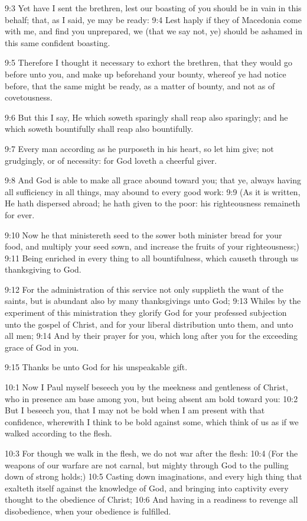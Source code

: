 9:3 Yet have I sent the brethren, lest our boasting of you should be
in vain in this behalf; that, as I said, ye may be ready: 9:4 Lest
haply if they of Macedonia come with me, and find you unprepared, we
(that we say not, ye) should be ashamed in this same confident
boasting.

9:5 Therefore I thought it necessary to exhort the brethren, that they
would go before unto you, and make up beforehand your bounty, whereof
ye had notice before, that the same might be ready, as a matter of
bounty, and not as of covetousness.

9:6 But this I say, He which soweth sparingly shall reap also
sparingly; and he which soweth bountifully shall reap also
bountifully.

9:7 Every man according as he purposeth in his heart, so let him give;
not grudgingly, or of necessity: for God loveth a cheerful giver.

9:8 And God is able to make all grace abound toward you; that ye,
always having all sufficiency in all things, may abound to every good
work: 9:9 (As it is written, He hath dispersed abroad; he hath given
to the poor: his righteousness remaineth for ever.

9:10 Now he that ministereth seed to the sower both minister bread for
your food, and multiply your seed sown, and increase the fruits of
your righteousness;) 9:11 Being enriched in every thing to all
bountifulness, which causeth through us thanksgiving to God.

9:12 For the administration of this service not only supplieth the
want of the saints, but is abundant also by many thanksgivings unto
God; 9:13 Whiles by the experiment of this ministration they glorify
God for your professed subjection unto the gospel of Christ, and for
your liberal distribution unto them, and unto all men; 9:14 And by
their prayer for you, which long after you for the exceeding grace of
God in you.

9:15 Thanks be unto God for his unspeakable gift.

10:1 Now I Paul myself beseech you by the meekness and gentleness of
Christ, who in presence am base among you, but being absent am bold
toward you: 10:2 But I beseech you, that I may not be bold when I am
present with that confidence, wherewith I think to be bold against
some, which think of us as if we walked according to the flesh.

10:3 For though we walk in the flesh, we do not war after the flesh:
10:4 (For the weapons of our warfare are not carnal, but mighty
through God to the pulling down of strong holds;) 10:5 Casting down
imaginations, and every high thing that exalteth itself against the
knowledge of God, and bringing into captivity every thought to the
obedience of Christ; 10:6 And having in a readiness to revenge all
disobedience, when your obedience is fulfilled.

